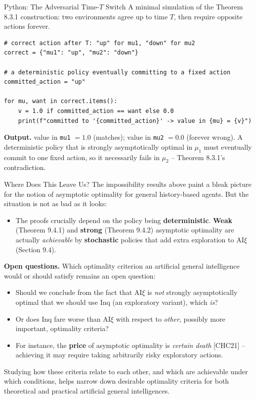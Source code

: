 \documentclass[aspectratio=169,10pt]{beamer}
\begin{document}
\begin{frame}[fragile]{Python: The Adversarial Time-$T$ Switch}
  A minimal simulation of the Theorem 8.3.1 construction: two environments
  agree up to time $T$, then require opposite actions forever.

\begin{lstlisting}[style=pythonstyle]
# correct action after T: "up" for mu1, "down" for mu2
correct = {"mu1": "up", "mu2": "down"}

# a deterministic policy eventually committing to a fixed action
committed_action = "up"

for mu, want in correct.items():
    v = 1.0 if committed_action == want else 0.0
    print(f"committed to '{committed_action}' -> value in {mu} = {v}")
\end{lstlisting}

  \textbf{Output.} value in \texttt{mu1} $=1.0$ (matches); value in
  \texttt{mu2} $=0.0$ (forever wrong). A deterministic policy that is
  strongly asymptotically optimal in $\mu_1$ must eventually commit to one
  fixed action, so it necessarily fails in $\mu_2$ -- Theorem 8.3.1's
  contradiction.
\end{frame}

\begin{frame}{Where Does This Leave Us?}
  The impossibility results above paint a bleak picture for the notion of
  asymptotic optimality for general history-based agents. But the
  situation is not as bad as it looks:
  \begin{itemize}
    \item The proofs crucially depend on the policy being
      \textbf{deterministic}. \textbf{Weak} (Theorem 9.4.1) and
      \textbf{strong} (Theorem 9.4.2) asymptotic optimality are actually
      \emph{achievable} by \textbf{stochastic} policies that add extra
      exploration to $\mathrm{AI}\xi$ (Section 9.4).
  \end{itemize}

  \bigskip
  \textbf{Open questions.} Which optimality criterion an artificial general
  intelligence would or should satisfy remains an open question:
  \begin{itemize}
    \item Should we conclude from the fact that $\mathrm{AI}\xi$ is
      \emph{not} strongly asymptotically optimal that we should use
      $\mathrm{Inq}$ (an exploratory variant), which \emph{is}?
    \item Or does $\mathrm{Inq}$ fare worse than $\mathrm{AI}\xi$ with
      respect to \emph{other}, possibly more important, optimality
      criteria?
    \item For instance, the \textbf{price} of asymptotic optimality is
      \emph{certain death} [CHC21] -- achieving it may require taking
      arbitrarily risky exploratory actions.
  \end{itemize}

  \bigskip
  Studying how these criteria relate to each other, and which are
  achievable under which conditions, helps narrow down desirable optimality
  criteria for both theoretical and practical artificial general
  intelligences.
\end{frame}
\end{document}
